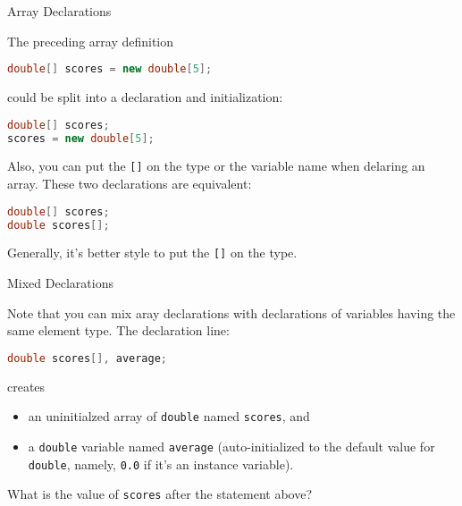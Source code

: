\documentclass{beamer}
\begin{document}
\begin{frame}[fragile]{Array Declarations}


The preceding array definition
\begin{lstlisting}[language=Java]
double[] scores = new double[5];
\end{lstlisting}
could be split into a declaration and initialization:
\begin{lstlisting}[language=Java]
double[] scores;
scores = new double[5];
\end{lstlisting}
Also, you can put the {\tt []} on the type or the variable name when delaring an array.  These two declarations are equivalent:
\begin{lstlisting}[language=Java]
double[] scores; 
double scores[];
\end{lstlisting}
Generally, it's better style to put the {\tt []} on the type.


\end{frame}

\begin{frame}[fragile]{Mixed Declarations}


Note that you can mix aray declarations with declarations of variables having the same element type.  The declaration line:
\begin{lstlisting}[language=Java]
double scores[], average;
\end{lstlisting}
creates
\begin{itemize}
\item an uninitialzed array of {\tt double} named {\tt scores}, and
\item a {\tt double} variable named {\tt average} (auto-initialized to the default value for {\tt double}, namely, {\tt 0.0} if it's an instance variable).
\end{itemize}

What is the value of {\tt scores} after the statement above?

\end{frame}
\end{document}
